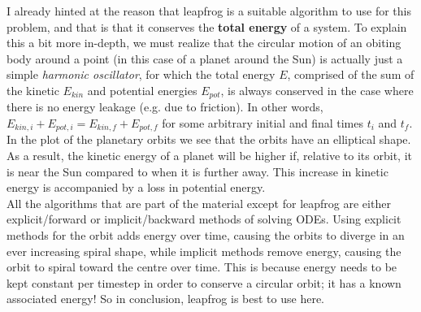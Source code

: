 I already hinted at the reason that leapfrog is a suitable algorithm to use for this problem, and that is that it conserves the \textbf{total energy} of a system. To explain this a bit more in-depth, we must realize that the circular motion of an obiting body around a point (in this case of a planet around the Sun) is actually just a simple \textit{harmonic oscillator}, for which the total energy $E$, comprised of the sum of the kinetic $E_{kin}$ and potential energies $E_{pot}$, is always conserved in the case where there is no energy leakage (e.g. due to friction). In other words, $E_{kin,i} + E_{pot,i} = E_{kin,f} + E_{pot,f}$ for some arbitrary initial and final times $t_i$ and $t_f$. In the plot of the planetary orbits we see that the orbits have an elliptical shape. As a result, the kinetic energy of a planet will be higher if, relative to its orbit, it is near the Sun compared to when it is further away. This increase in kinetic energy is accompanied by a loss in potential energy.\\

All the algorithms that are part of the material except for leapfrog are either explicit/forward or implicit/backward methods of solving ODEs. Using explicit methods for the orbit adds energy over time, causing the orbits to diverge in an ever increasing spiral shape, while implicit methods remove energy, causing the orbit to spiral toward the centre over time. This is because energy needs to be kept constant per timestep in order to conserve a circular orbit; it has a known associated energy! So in conclusion, leapfrog is best to use here. 















